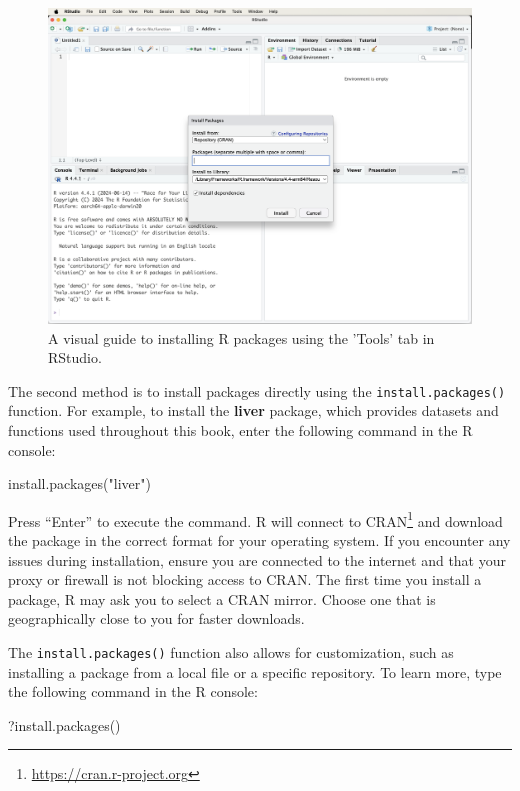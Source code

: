 \documentclass[
  11pt,
]{book}
\makeatletter
\newenvironment{Shaded}{}{}
\newcommand{\FunctionTok}[1]{#1}
\newcommand{\NormalTok}[1]{#1}
\newcommand{\StringTok}[1]{\textcolor[rgb]{0.39,0.39,0.39}{#1}}
\renewcommand{\href}[2]{#2\footnote{\url{#1}}}
\newenvironment{kframe}{%
\medskip{}
\setlength{\fboxsep}{.8em}
 \def\at@end@of@kframe{}%
 \ifinner\ifhmode%
  \def\at@end@of@kframe{\end{minipage}}%
  \begin{minipage}{\columnwidth}%
 \fi\fi%
 \def\FrameCommand##1{\hskip\@totalleftmargin \hskip-\fboxsep
 \colorbox{shadecolor}{##1}\hskip-\fboxsep
     \hskip-\linewidth \hskip-\@totalleftmargin \hskip\columnwidth}%
 \MakeFramed {\advance\hsize-\width
   \@totalleftmargin\z@ \linewidth\hsize
   \@setminipage}}%
 {\par\unskip\endMakeFramed%
 \at@end@of@kframe}
\renewenvironment{Shaded}{\begin{kframe}}{\end{kframe}}
\theoremstyle{definition}
\theoremstyle{definition}
\theoremstyle{definition}
\theoremstyle{definition}
\theoremstyle{remark}
\makeatother
\begin{document}
\begin{figure}[H]

{\centering \includegraphics[width=0.7\linewidth]{images/ch1_RStudio-window-install} 

}

\caption{A visual guide to installing R packages using the 'Tools' tab in RStudio.}\label{fig:install-packages}
\end{figure}

The second method is to install packages directly using the \texttt{install.packages()} function. For example, to install the \textbf{liver} package, which provides datasets and functions used throughout this book, enter the following command in the R console:

\begin{Shaded}
\begin{Highlighting}[]
\FunctionTok{install.packages}\NormalTok{(}\StringTok{"liver"}\NormalTok{)}
\end{Highlighting}
\end{Shaded}

Press ``Enter'' to execute the command. R will connect to \href{https://cran.r-project.org}{CRAN} and download the package in the correct format for your operating system. If you encounter any issues during installation, ensure you are connected to the internet and that your proxy or firewall is not blocking access to CRAN. The first time you install a package, R may ask you to select a CRAN mirror. Choose one that is geographically close to you for faster downloads.

The \texttt{install.packages()} function also allows for customization, such as installing a package from a local file or a specific repository. To learn more, type the following command in the R console:

\begin{Shaded}
\begin{Highlighting}[]
\NormalTok{?}\FunctionTok{install.packages}\NormalTok{()}
\end{Highlighting}
\end{Shaded}
\end{document}
